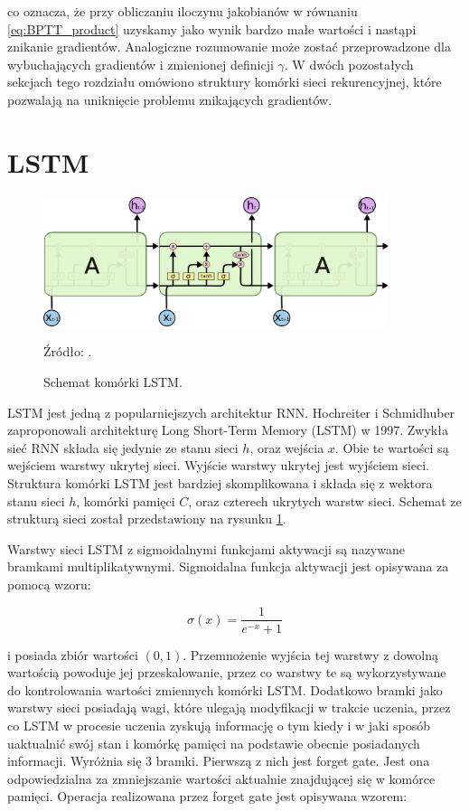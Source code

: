 \documentclass[oneside, mag]{mgr}
\begin{document}
co oznacza, że przy obliczaniu iloczynu jakobianów w równaniu \ref{eq:BPTT_product} uzyskamy jako wynik bardzo małe wartości i nastąpi znikanie gradientów. Analogiczne rozumowanie może zostać przeprowadzone dla wybuchających gradientów i zmienionej definicji $\gamma$. W dwóch pozostałych sekcjach tego rozdziału omówiono struktury komórki sieci rekurencyjnej, które pozwalają na uniknięcie problemu znikających gradientów. 


\section{LSTM}

\begin{figure}
\centering
	\includegraphics[width=0.90\textwidth]{img/lstm_colah.png}
	\caption{Schemat komórki LSTM.} Źródło: \cite{colah}.
	\label{fig:lstm}
\end{figure}

LSTM jest jedną z popularniejszych architektur RNN. Hochreiter i Schmidhuber zaproponowali architekturę Long Short-Term Memory (LSTM) \cite{LSTM} w 1997. Zwykła sieć RNN składa się jedynie ze stanu sieci $h$, oraz wejścia $x$. Obie te wartości są wejściem warstwy ukrytej sieci. Wyjście warstwy ukrytej jest wyjściem sieci. Struktura komórki LSTM jest bardziej skomplikowana i składa się z wektora stanu sieci $h$, komórki pamięci $C$, oraz czterech ukrytych warstw sieci. Schemat ze strukturą sieci został przedstawiony na rysunku \ref{fig:lstm}.

Warstwy sieci LSTM z sigmoidalnymi funkcjami aktywacji są nazywane bramkami multiplikatywnymi. Sigmoidalna funkcja aktywacji jest opisywana za pomocą wzoru:

\begin{equation}
	\sigma(x) = \frac{1}{e^{-x} + 1}
\end{equation}

i posiada zbiór wartości $(0, 1)$. Przemnożenie wyjścia tej warstwy z dowolną wartością powoduje jej przeskalowanie, przez co warstwy te są wykorzystywane do kontrolowania wartości zmiennych komórki LSTM. Dodatkowo bramki jako warstwy sieci posiadają wagi, które ulegają modyfikacji w trakcie uczenia, przez co LSTM w procesie uczenia zyskują informację o tym kiedy i w jaki sposób uaktualnić swój stan i komórkę pamięci na podstawie obecnie posiadanych informacji. Wyróżnia się 3 bramki. Pierwszą z nich jest forget gate. Jest ona odpowiedzialna za zmniejszanie wartości aktualnie znajdującej się w komórce pamięci. Operacja realizowana przez forget gate jest opisywana wzorem: 
\end{document}

